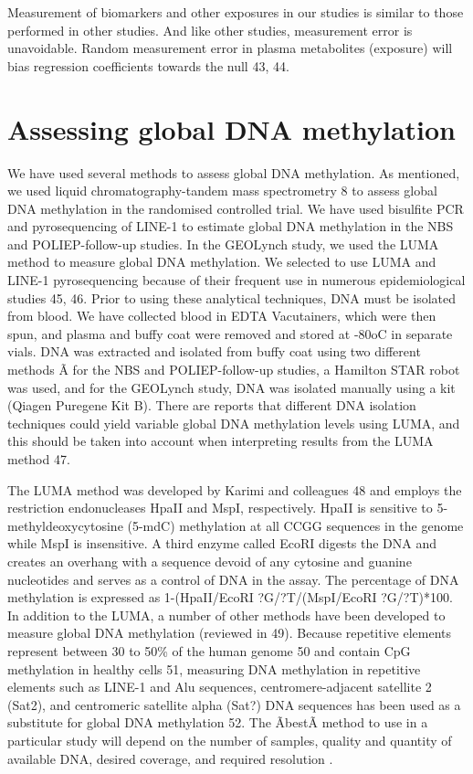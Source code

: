 \noindent Measurement of biomarkers and other exposures in our studies is similar to those performed in other studies. And like other studies, measurement error is unavoidable. Random measurement error in plasma metabolites (exposure) will bias regression coefficients towards the null 43, 44. 
 
\section[]{Assessing global DNA methylation} %
We have used several methods to assess global DNA methylation. As mentioned, we used liquid chromatography-tandem mass spectrometry 8 to assess global DNA methylation in the randomised controlled trial. We have used bisulfite PCR and pyrosequencing of LINE-1 to estimate global DNA methylation in the NBS and POLIEP-follow-up studies. In the GEOLynch study, we used the LUMA method to measure global DNA methylation. We selected to use LUMA and LINE-1 pyrosequencing because of their frequent use in numerous epidemiological studies 45, 46. Prior to using these analytical techniques, DNA must be isolated from blood. We have collected blood in EDTA Vacutainers, which were then spun, and plasma and buffy coat were removed and stored at -80oC in separate vials. DNA was extracted and isolated from buffy coat using two different methods Ã for the NBS and POLIEP-follow-up studies, a Hamilton STAR robot was used, and for the GEOLynch study, DNA was isolated manually using a kit (Qiagen Puregene Kit B). There are reports 
that different DNA isolation techniques could yield variable global DNA methylation levels using LUMA, and this should be taken into account when interpreting results from the LUMA method 47. 
 
\noindent The LUMA method was developed by Karimi and colleagues 48 and employs the restriction endonucleases HpaII and MspI, respectively. HpaII is sensitive to 5-methyldeoxycytosine (5-mdC) methylation at all CCGG sequences in the genome while MspI is insensitive. A third enzyme called EcoRI digests the DNA and creates an overhang with a sequence devoid of any cytosine and guanine nucleotides and serves as a control of DNA in the assay. The percentage of DNA methylation is expressed as 1-(HpaII/EcoRI ?G/?T/(MspI/EcoRI ?G/?T)*100. In addition to the LUMA, a number of other methods have been developed to measure global DNA methylation (reviewed in 49). Because repetitive elements represent between 30 to 50\% of the human genome 50 and contain CpG methylation in healthy cells 51, measuring DNA methylation in repetitive elements such as LINE-1 and Alu sequences, centromere-adjacent satellite 2 (Sat2), and centromeric satellite alpha (Sat?) DNA sequences has been used as a substitute for global DNA methylation 
52. The ÃbestÃ method to use in a particular study will depend on the number of samples, quality and quantity of available DNA, desired coverage, and required resolution \cite{c749}. 
 
